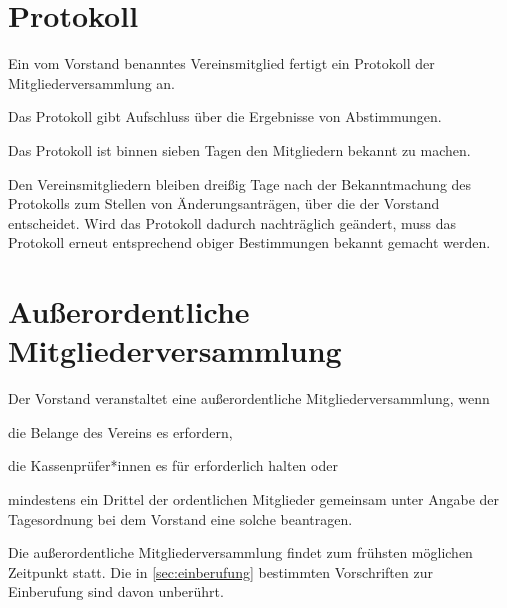 \section{Protokoll}
\begin{absätze}
    \item Ein vom Vorstand benanntes Vereinsmitglied fertigt ein Protokoll der Mitgliederversammlung an.
    \item Das Protokoll gibt Aufschluss über die Ergebnisse von Abstimmungen.
    \item Das Protokoll ist binnen sieben Tagen den Mitgliedern bekannt zu machen.
    \item Den Vereinsmitgliedern bleiben dreißig Tage nach der Bekanntmachung des Protokolls zum Stellen von Änderungsanträgen, über die der Vorstand entscheidet. Wird das Protokoll dadurch nachträglich geändert, muss das Protokoll erneut entsprechend obiger Bestimmungen bekannt gemacht werden.
\end{absätze}

\section{Außerordentliche Mitgliederversammlung}
\begin{absätze}
    \item Der Vorstand veranstaltet eine außerordentliche Mitgliederversammlung, wenn
    \begin{sätze}
        \item die Belange des Vereins es erfordern,
        \item die Kassenprüfer*innen es für erforderlich halten oder
        \item mindestens ein Drittel der ordentlichen Mitglieder gemeinsam unter Angabe der Tagesordnung bei dem Vorstand eine solche beantragen.
	\end{sätze}
\item Die außerordentliche Mitgliederversammlung findet zum frühsten möglichen Zeitpunkt statt. Die in \ref{sec:einberufung} bestimmten Vorschriften zur Einberufung sind davon unberührt.
\end{absätze}
